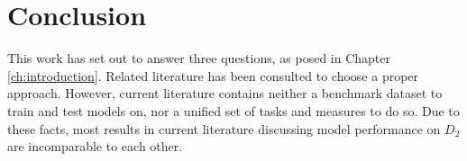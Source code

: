 \section{Conclusion}\label{ch:conclusion}
This work has set out to answer three questions, as posed in Chapter \ref{ch:introduction}. Related literature has been consulted to choose a proper approach. However, current literature contains neither a benchmark dataset to train and test models on, nor a unified set of tasks and measures to do so. Due to these facts, most results in current literature discussing model performance on $D_{2}$ are incomparable to each other.

%
%
%
%
